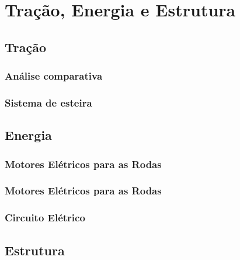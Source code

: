 
  \section{Tração, Energia e Estrutura}



  \subsection{Tração}

    \subsubsection{Análise comparativa}



      \subsubsection{Sistema de esteira}




    \newpage







  \subsection{Energia}

    \subsubsection{Motores Elétricos para as Rodas}


     \subsubsection{Motores Elétricos para as Rodas}


      \subsubsection{Circuito Elétrico}


  \newpage
  \subsection{Estrutura}

